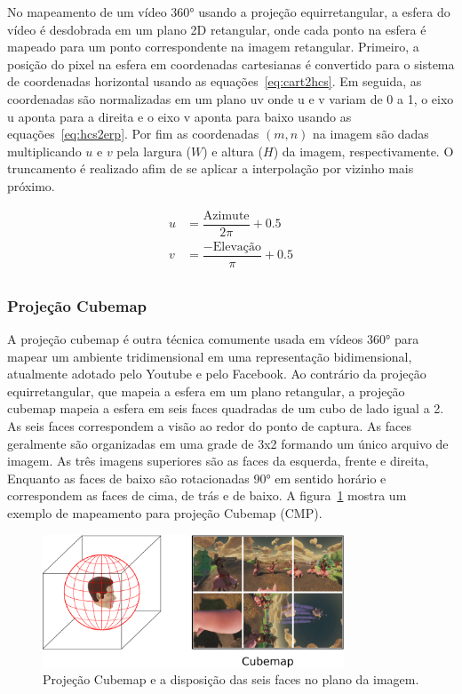 No mapeamento de um vídeo 360° usando a projeção equirretangular, a esfera do vídeo é desdobrada em um plano 2D retangular, onde cada ponto na esfera é mapeado para um ponto correspondente na imagem retangular. Primeiro, a posição do pixel na esfera em coordenadas cartesianas é convertido para o sistema de coordenadas horizontal usando as equações~\ref{eq:cart2hcs}. Em seguida, as coordenadas são normalizadas em um plano uv onde u e v variam de 0 a 1, o eixo u aponta para a direita e o eixo v aponta para baixo usando as equações~\ref{eq:hcs2erp}. Por fim as coordenadas $(m, n)$ na imagem são dadas multiplicando $u$ e $v$ pela largura ($W$) e altura ($H$) da  imagem, respectivamente. O truncamento é realizado afim de se aplicar a interpolação por vizinho mais próximo.

\begin{align}
    u &= \dfrac{\text{Azimute}}{2\pi} + 0.5 \\
    v &= \dfrac{-\text{Elevação}}{\pi} + 0.5 \\
    \label{eq:hcs2erp}
\end{align}

\subsubsection{Projeção Cubemap}

A projeção cubemap é outra técnica comumente usada em vídeos 360° para mapear um ambiente tridimensional em uma representação bidimensional, atualmente adotado pelo Youtube e pelo Facebook. Ao contrário da projeção equirretangular, que mapeia a esfera em um plano retangular, a projeção cubemap mapeia a esfera em seis faces quadradas de um cubo de lado igual a 2. As seis faces correspondem a visão ao redor do ponto de captura. As faces geralmente são organizadas em uma grade de 3x2 formando um único arquivo de imagem. As três imagens superiores são as faces da esquerda, frente e direita, Enquanto as faces de baixo são rotacionadas 90° em sentido horário e correspondem as faces de cima, de trás e de baixo. A figura~\ref{fig:cmp} mostra um exemplo de mapeamento para projeção Cubemap (CMP).

\begin{figure}
    \centering
    \includegraphics[width=0.8\textwidth]{fig/cmp.png}
    \caption{Projeção Cubemap e a disposição das seis faces no plano da imagem.}
    \label{fig:cmp}
\end{figure}

